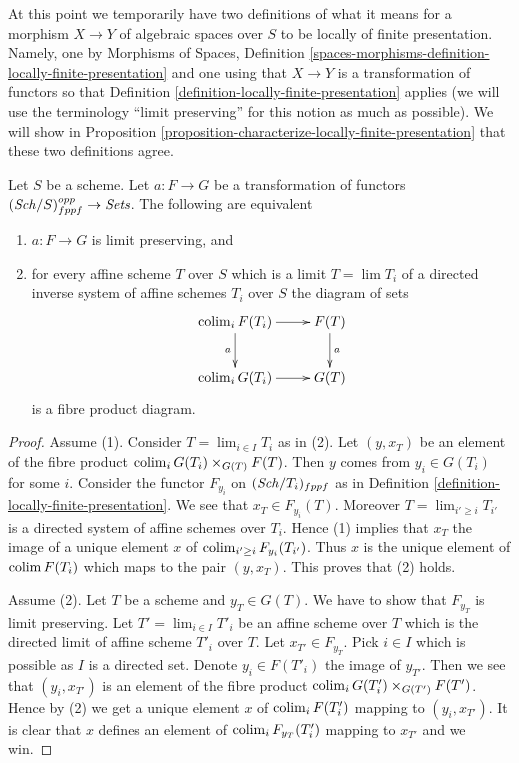 \medskip\noindent
At this point we temporarily have two definitions of what it means
for a morphism $X \to Y$ of algebraic spaces over $S$ to be locally of finite
presentation. Namely, one by
Morphisms of Spaces,
Definition \ref{spaces-morphisms-definition-locally-finite-presentation}
and one using that $X \to Y$ is a transformation of functors so that
Definition \ref{definition-locally-finite-presentation}
applies (we will use the terminology ``limit preserving''
for this notion as much as possible). We will show in
Proposition \ref{proposition-characterize-locally-finite-presentation}
that these two definitions agree.

\begin{lemma}
\label{lemma-characterize-relative-limit-preserving}
Let $S$ be a scheme. Let $a : F \to G$ be a transformation of functors
$(\mathit{Sch}/S)_{fppf}^{opp} \to \textit{Sets}$.
The following are equivalent
\begin{enumerate}
\item $a : F \to G$ is limit preserving, and
\item for every affine scheme $T$ over $S$ which is a
limit $T = \lim T_i$ of a directed inverse system of affine
schemes $T_i$ over $S$ the diagram of sets
$$
\xymatrix{
\colim_i F(T_i) \ar[r] \ar[d]_a & F(T) \ar[d]^a \\
\colim_i G(T_i) \ar[r] & G(T)
}
$$
is a fibre product diagram.
\end{enumerate}
\end{lemma}

\begin{proof}
Assume (1). Consider $T = \lim_{i \in I} T_i$ as in (2). Let
$(y, x_T)$ be an element of the fibre product
$\mathop{\mathrm{colim}}\nolimits_i G(T_i) \times_{G(T)} F(T)$.
Then $y$ comes from $y_i \in G(T_i)$ for some $i$.
Consider the functor $F_{y_i}$ on $(\mathit{Sch}/T_i)_{fppf}$ as in
Definition \ref{definition-locally-finite-presentation}.
We see that $x_T \in F_{y_i}(T)$. Moreover $T = \lim_{i' \geq i} T_{i'}$
is a directed system of affine schemes over $T_i$. Hence (1) implies
that $x_T$ the image of a unique element $x$ of
$\mathop{\mathrm{colim}}\nolimits_{i' \geq i} F_{y_i}(T_{i'})$. Thus $x$ is the unique
element of $\mathop{\mathrm{colim}}\nolimits F(T_i)$ which maps to the pair $(y, x_T)$.
This proves that (2) holds.

\medskip\noindent
Assume (2). Let $T$ be a scheme and $y_T \in G(T)$. We have to show that
$F_{y_T}$ is limit preserving. Let $T' = \lim_{i \in I} T'_i$ be an
affine scheme over $T$ which is the directed limit of affine scheme $T'_i$
over $T$. Let $x_{T'} \in F_{y_T}$. Pick $i \in I$ which is possible as
$I$ is a directed set. Denote $y_i \in F(T'_i)$ the
image of $y_{T'}$. Then we see that $(y_i, x_{T'})$ is an
element of the fibre product
$\mathop{\mathrm{colim}}\nolimits_i G(T'_i) \times_{G(T')} F(T')$.
Hence by (2) we get a unique element $x$ of $\mathop{\mathrm{colim}}\nolimits_i F(T'_i)$
mapping to $(y_i, x_{T'})$. It is clear that $x$ defines an element
of $\mathop{\mathrm{colim}}\nolimits_i F_{y_T}(T'_i)$ mapping to $x_{T'}$ and we win.
\end{proof}

